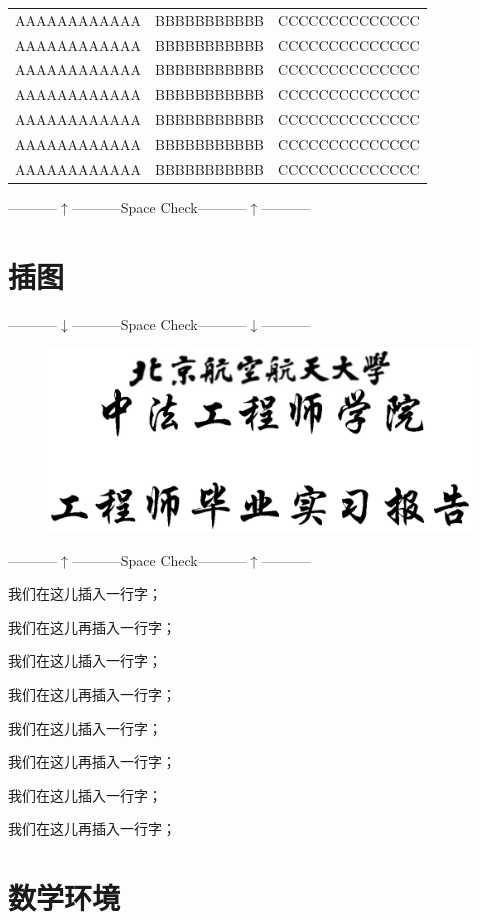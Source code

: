 \begin{longtable}[h]{ccc}
  AAAAAAAAAAAA   &   BBBBBBBBBBB   &   CCCCCCCCCCCCCC   \\
  AAAAAAAAAAAA   &   BBBBBBBBBBB   &   CCCCCCCCCCCCCC   \\
  AAAAAAAAAAAA   &   BBBBBBBBBBB   &   CCCCCCCCCCCCCC   \\
  AAAAAAAAAAAA   &   BBBBBBBBBBB   &   CCCCCCCCCCCCCC   \\
  AAAAAAAAAAAA   &   BBBBBBBBBBB   &   CCCCCCCCCCCCCC   \\
  AAAAAAAAAAAA   &   BBBBBBBBBBB   &   CCCCCCCCCCCCCC   \\
  AAAAAAAAAAAA   &   BBBBBBBBBBB   &   CCCCCCCCCCCCCC   \\
\end{longtable}

\centerline{-----------$\uparrow$-----------Space Check-----------$\uparrow$-----------}


\section{插图}

\centerline{-----------$\downarrow$-----------Space Check-----------$\downarrow$-----------}
\begin{figure}[!h]
  \centering
  \includegraphics[width=.5\textwidth]{pic/head-intern}
  \label{fig:logo}
\end{figure}
\centerline{-----------$\uparrow$-----------Space Check-----------$\uparrow$-----------}

我们在这儿插入一行字；

我们在这儿再插入一行字；

我们在这儿插入一行字；

我们在这儿再插入一行字；

我们在这儿插入一行字；

我们在这儿再插入一行字；

我们在这儿插入一行字；

我们在这儿再插入一行字；

\section{数学环境}

